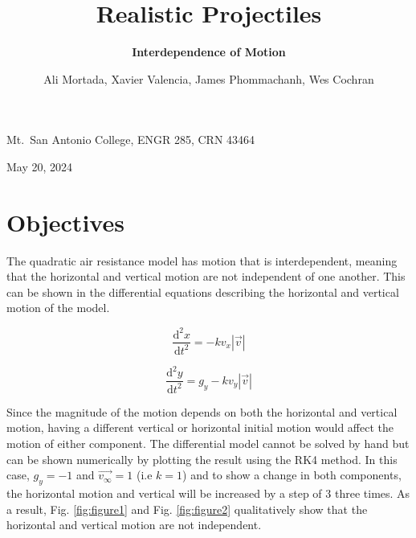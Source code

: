 \documentclass[12pt]{iopart} %
\begin{document}
\title{Realistic Projectiles}
\author{Ali Mortada, Xavier Valencia, James Phommachanh, Wes Cochran}
\vspace{10pt}
\begin{indented}
  \item[]Mt.~San Antonio College, ENGR 285, CRN 43464
  \item[]May 20, 2024
\end{indented}
\newpage

\section{Objectives}

\begin{center}
\subtitle{\textbf{Interdependence of Motion}}
\end{center}

The quadratic air resistance model has motion that is interdependent, meaning that the horizontal and vertical motion are not independent of one another. 
This can be shown in the differential equations describing the horizontal and vertical motion of the model. 

\begin{equation} \label{eq:1}
    \frac{\mathrm{d}^2 x}{\mathrm{d}t^2} = -k v_x |\vec{v}|
\end{equation}

\begin{equation} \label{eq:2}
  \frac{\mathrm{d}^2 y}{\mathrm{d}t^2} = g_y -k v_y |\vec{v}|
\end{equation}


Since the magnitude of the motion depends on both the horizontal and vertical motion, having a different vertical or horizontal initial motion would affect the motion of either component. 
The differential model cannot be solved by hand but can be shown numerically by plotting the result using the RK4 method. 
In this case, $g_y = -1$ and $\vec{v_\infty} = 1$ (i.e $k = 1$) and to show a change in both components, the horizontal motion and vertical will be increased by a step of 3 three times. 
As a result, Fig. \ref{fig:figure1} and Fig. \ref{fig:figure2} qualitatively show that the horizontal and vertical motion are not independent. 
\end{document}

